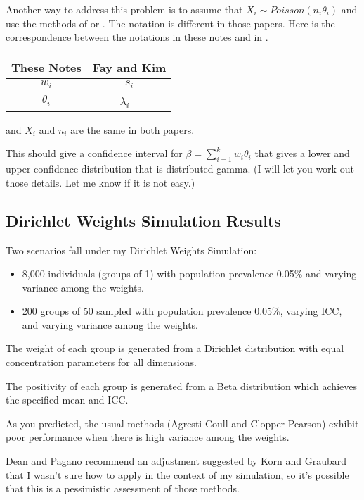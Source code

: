 \documentclass{article}
\begin{document}
Another way to address this problem is to assume that $X_i \sim Poisson( n_i \theta_i)$ and use the methods
of \citet{FayF:1997} or \citet{FayK:2017}.
The notation is different in those papers. Here is the correspondence between the notations in these notes and in \citet{FayK:2017}.

\begin{tabular}{cc}
These Notes & Fay and Kim  \\ \hline
$w_i$     & $s_i$ \\
$\theta_i$ & $\lambda_i$ \
\end{tabular}

and $X_i$ and $n_i$ are the same in both papers. 


This should give a confidence interval for $\beta=\sum_{i=1}^{k} w_i \theta_i$
that gives a lower and upper confidence distribution that is distributed gamma. (I will let you work out those details. Let me know if it is not easy.)

\subsection{Dirichlet Weights Simulation Results}

Two scenarios fall under my Dirichlet Weights Simulation:

\begin{itemize}
    \item 8,000 individuals (groups of 1) with population prevalence 0.05\% and varying variance among the weights.
    \item 200 groups of 50 sampled with population prevalence 0.05\%, varying ICC, and varying variance among the weights.
\end{itemize}

The weight of each group is generated from a Dirichlet distribution with equal concentration parameters for all dimensions.

The positivity of each group is generated from a Beta distribution which achieves the specified mean and ICC.



As you predicted, the usual methods (Agresti-Coull and Clopper-Pearson) exhibit poor performance when there is high variance among the weights.

Dean and Pagano recommend an adjustment suggested by Korn and Graubard that I wasn’t sure how to apply in the context of my simulation, so it’s possible that this is a pessimistic assessment of those methods. 
\end{document}
